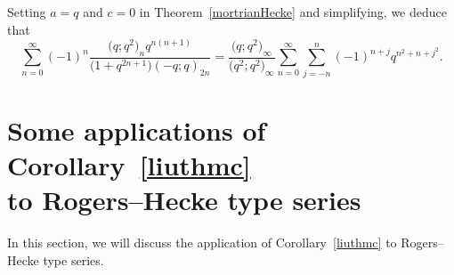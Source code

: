 \documentclass[10pt,a4paper]{amsart}
\numberwithin{equation}{section}
\begin{document}
Setting $a=q$ and $c=0$ in Theorem~\ref{mortrianHecke} and simplifying, we deduce that
\begin{equation*}%
\sum_{n=0}^\infty (-1)^n \frac{\bigl(q; q^2\bigr)_n q^{n(n+1)}}{\bigl(1+q^{2n+1}\bigr)(-q; q)_{2n}}
=\frac{\bigl(q; q^2\bigr)_\infty}{\bigl(q^2; q^2\bigr)_\infty}
\sum_{n=0}^{\infty}\sum_{j=-n}^{n}(-1)^{n+j} q^{n^2+n+j^2}.
\end{equation*}

\section[Some applications of Corollary~\ref{liuthmc} to Rogers--Hecke type series]{Some applications of Corollary~\ref{liuthmc} \\ to Rogers--Hecke type series}\label{sec6}

In this section, we will discuss the application of Corollary~\ref{liuthmc} to Rogers--Hecke type series.
\end{document}
